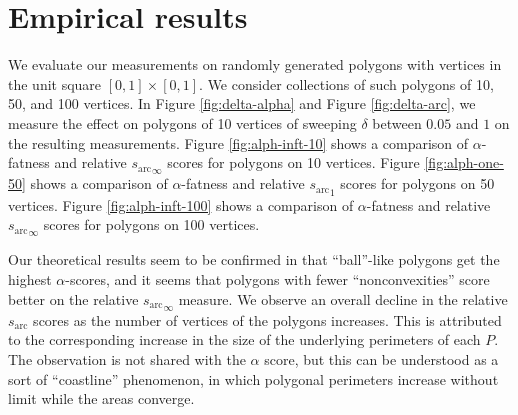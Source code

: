 \documentclass[]{jocg}
\newcommand{\chordarc}{{s_{\textrm{arc}}}}
\theoremstyle{definition}
\theoremstyle{remark}
\begin{document}
\section{Empirical results}

We evaluate our measurements on randomly generated polygons with vertices in the
unit square $[0,1] \times [0,1]$. We consider collections of such polygons of
10, 50, and 100 vertices. In Figure \ref{fig:delta-alpha} and Figure
\ref{fig:delta-arc}, we measure the effect on
polygons of 10 vertices of sweeping $\delta$ between $0.05$ and $1$ on the
resulting measurements. Figure \ref{fig:alph-inft-10} shows a comparison of
$\alpha$-fatness and relative ${\chordarc}_{\infty}$ scores for polygons on 10
vertices.  Figure \ref{fig:alph-one-50} shows a comparison of $\alpha$-fatness
and relative ${\chordarc}_1$ scores for polygons on 50 vertices. Figure
\ref{fig:alph-inft-100} shows a comparison of $\alpha$-fatness and relative
${\chordarc}_{\infty}$ scores for polygons on 100 vertices.

Our theoretical results seem to be confirmed in that ``ball''-like polygons get
the highest $\alpha$-scores, and it seems that polygons with fewer
``nonconvexities'' score better on the relative ${\chordarc}_{\infty}$ measure. We
observe an overall decline in the relative $\chordarc$ scores as the number of
vertices of the polygons increases. This is attributed to the corresponding
increase in the size of the underlying perimeters of each $P$. The observation
is not shared with the $\alpha$ score, but this can be understood as a sort of
``coastline'' phenomenon, in which polygonal perimeters increase without limit
while the areas converge.
\end{document}
